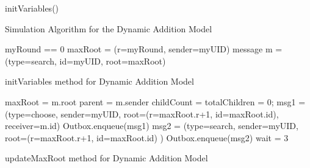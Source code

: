 \documentclass[english]{article}
\begin{document}
\begin{algorithm}
  initVariables() \;

  \caption{Simulation Algorithm for the Dynamic Addition Model}
\end{algorithm}

\begin{algorithm}[initVariables]
  myRound == 0 \;
  maxRoot = (r=myRound, sender=myUID) \; 
  message m = (type=search, id=myUID, root=maxRoot) \;
  \caption{initVariables method for Dynamic Addition Model}
\end{algorithm}

\begin{algorithm}
  maxRoot = m.root\; %
  parent = m.sender\; %
  childCount = totalChildren = 0; %
  msg1 = (type=choose, sender=myUID, root=(r=maxRoot.r+1, id=maxRoot.id), receiver=m.id) \; %
  Outbox.enqueue(msg1) \;
  msg2 = (type=search, sender=myUID, root=(r=maxRoot.r+1, id=maxRoot.id) ) \; %
  Outbox.enqueue(msg2) \;
  wait = 3 \; %
  \caption{updateMaxRoot method for Dynamic Addition Model}
\end{algorithm}
\end{document}
